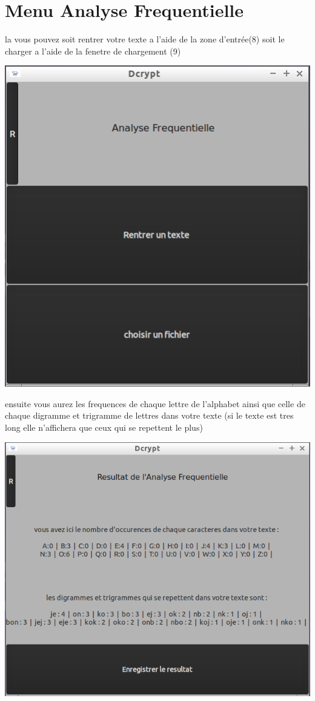 \documentclass[a4]{article}
\begin{document}
		
	\section{Menu Analyse Frequentielle}
			la vous pouvez soit rentrer votre texte a l'aide de la zone d'entrée(8)
			soit le charger a l'aide de la fenetre de chargement (9)
		\begin{center}\includegraphics[scale=0.4]{17.png}\end{center}
			ensuite vous aurez les frequences de chaque lettre de l'alphabet ainsi que
			celle de chaque digramme et trigramme de lettres dans votre texte
			(si le texte est tres long elle n'affichera que ceux qui se repettent le plus)
		\begin{center}\includegraphics[scale=0.4]{18.png}\end{center}
\end{document}
